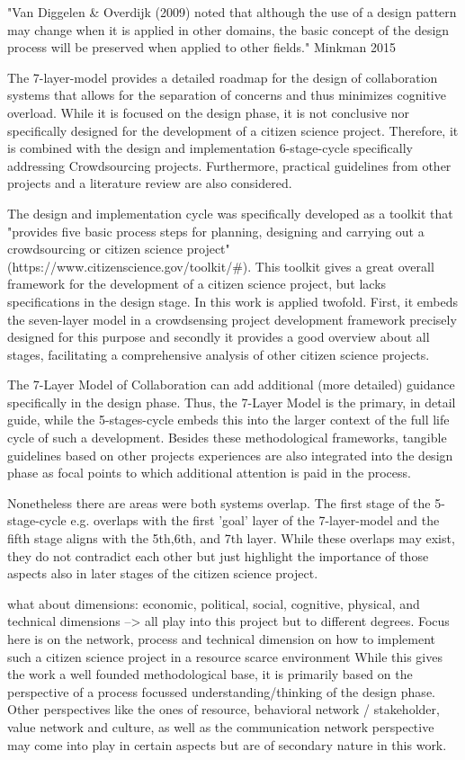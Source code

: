 "Van Diggelen & Overdijk (2009) noted that although the use of a design pattern may change when it is applied in other domains, the basic concept of the design process will be preserved when applied to other fields." Minkman 2015

The 7-layer-model provides a detailed roadmap for the design of collaboration systems that allows for the separation of concerns and thus minimizes cognitive overload. While it is focused on the design phase, it is not conclusive nor specifically designed for the development of a citizen science project. Therefore, it is combined with the design and implementation 6-stage-cycle specifically addressing Crowdsourcing projects. Furthermore, practical guidelines from other projects and a literature review are also considered.

The design and implementation cycle was specifically developed as a toolkit that "provides five basic process steps for planning, designing and carrying out a crowdsourcing or citizen science project" (https://www.citizenscience.gov/toolkit/#). This toolkit gives a great overall framework for the development of a citizen science project, but lacks specifications in the design stage. In this work is applied twofold. First, it embeds the seven-layer model in a crowdsensing project development framework precisely designed for this purpose and secondly it provides a good overview about all stages, facilitating a comprehensive analysis of other citizen science projects. 

The 7-Layer Model of Collaboration can add additional (more detailed) guidance specifically in the design phase. Thus, the 7-Layer Model is the primary, in detail guide, while the 5-stages-cycle embeds this into the larger context of the full life cycle of such a development.
Besides these methodological frameworks, tangible guidelines based on other projects experiences are also integrated into the design phase as focal points to which additional attention is paid in the process.

Nonetheless there are areas were both systems overlap. The first stage of the 5-stage-cycle e.g. overlaps with the first 'goal' layer of the 7-layer-model and the fifth stage aligns with the 5th,6th, and 7th layer. While these overlaps may exist, they do not contradict each other but just highlight the importance of those aspects also in later stages of the citizen science project.

what about dimensions: economic, political, social, cognitive, physical, and technical dimensions
--> all play into this project but to different degrees. Focus here is on the network, process and technical dimension on how to implement such a citizen science project in a resource scarce environment
While this gives the work a well founded methodological base, it is primarily based on the perspective of a process focussed understanding/thinking of the design phase. Other perspectives like the ones of resource, behavioral network / stakeholder, value network and culture, as well as the communication network perspective may come into play in certain aspects but are of secondary nature in this work.

